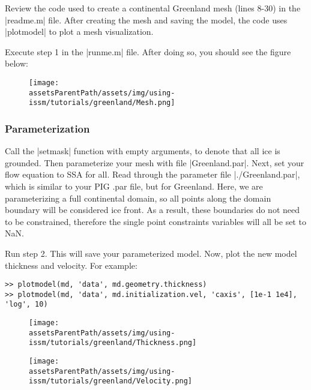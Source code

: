 Review the code used to create a continental Greenland mesh (lines 8-30) in the \lstinlinebg|readme.m| file. After creating the mesh and saving the model, the code uses \lstinlinebg|plotmodel| to plot a mesh visualization.

Execute step 1 in the \lstinlinebg|runme.m| file. After doing so, you should see the figure below:
\begin{figure}[H]
	\begin{center}
		\texttt{[image: \\assetsParentPath/assets/img/using-issm/tutorials/greenland/Mesh.png]}
	\end{center}
\end{figure}

\subsubsection{Parameterization} %
Call the \lstinlinebg|setmask| function with empty arguments, to denote that all ice is grounded. Then parameterize your mesh with file \lstinlinebg|Greenland.par|. Next, set your flow equation to SSA for all. Read through the parameter file \lstinlinebg|./Greenland.par|, which is similar to your PIG .par file, but for Greenland. Here, we are parameterizing a full continental domain, so all points along the domain boundary will be considered ice front. As a result, these boundaries do not need to be constrained, therefore the single point constraints variables will all be set to NaN.

Run step 2. This will save your parameterized model. Now, plot the new model thickness and velocity. For example:
\begin{lstlisting}
>> plotmodel(md, 'data', md.geometry.thickness)
>> plotmodel(md, 'data', md.initialization.vel, 'caxis', [1e-1 1e4], 'log', 10)
\end{lstlisting}

\begin{figure}[H]
	\begin{center}
		\texttt{[image: \\assetsParentPath/assets/img/using-issm/tutorials/greenland/Thickness.png]}
	\end{center}
\end{figure}

\begin{figure}[H]
	\begin{center}
		\texttt{[image: \\assetsParentPath/assets/img/using-issm/tutorials/greenland/Velocity.png]}
	\end{center}
\end{figure}

